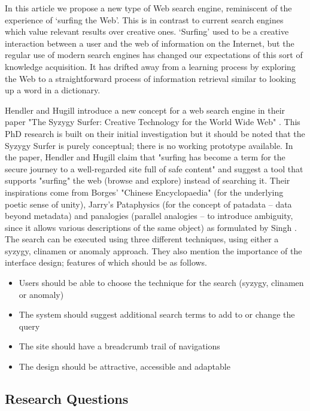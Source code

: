 In this article we propose a new type of Web search engine, reminiscent of the experience of ‘surfing the Web'. This is in contrast to current search engines which value relevant results over creative ones. ‘Surfing' used to be a creative interaction between a user and the web of information on the Internet, but the regular use of modern search engines has changed our expectations of this sort of knowledge acquisition. It has drifted away from a learning process by exploring the Web to a straightforward process of information retrieval similar to looking up a word in a dictionary.

Hendler and Hugill introduce a new concept for a web search engine in their paper "The Syzygy Surfer: Creative Technology for the World Wide Web" \citep{Hendler2011}. This PhD research is built on their initial investigation but it should be noted that the Syzygy Surfer is purely conceptual; there is no working prototype available. In the paper, Hendler and Hugill claim that "surfing has become a term for the secure journey to a well-regarded site full of safe content" and suggest a tool that supports "surfing" the web (browse and explore) instead of searching it. Their inspirations come from Borges' "Chinese Encyclopaedia" \citep{Borges2000} (for the underlying poetic sense of unity), Jarry's Pataphysics (for the concept of patadata – data beyond metadata) and  panalogies (parallel analogies – to introduce ambiguity, since it allows various descriptions of the same object) as formulated by Singh \citep{Singh2005}. The search can be executed using three different techniques, using either a syzygy, clinamen or anomaly approach. They also mention the importance of the interface design; features of which should be as follows.

\begin{itemize}
  \item Users should be able to choose the technique for the search (syzygy, clinamen or anomaly)
  \item The system should suggest additional search terms to add to or change the query
  \item The site should have a breadcrumb trail of navigations
  \item The design should be attractive, accessible and adaptable
\end{itemize}

\subsection{Research Questions}

